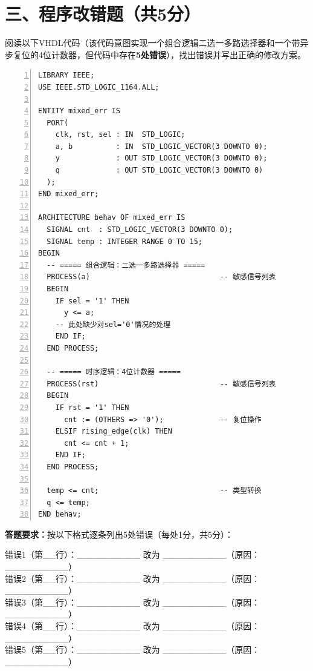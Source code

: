 \newpage

\section*{三、程序改错题（共5分）}

阅读以下VHDL代码（该代码意图实现一个组合逻辑二选一多路选择器和一个带异步复位的4位计数器，但代码中存在\textbf{5处错误}），找出错误并写出正确的修改方案。

\begin{lstlisting}[caption={存在5处错误的VHDL代码}, language=VDL, numbers=left]
LIBRARY IEEE;
USE IEEE.STD_LOGIC_1164.ALL;

ENTITY mixed_err IS
  PORT(
    clk, rst, sel : IN  STD_LOGIC;
    a, b          : IN  STD_LOGIC_VECTOR(3 DOWNTO 0);
    y             : OUT STD_LOGIC_VECTOR(3 DOWNTO 0);
    q             : OUT STD_LOGIC_VECTOR(3 DOWNTO 0)
  );
END mixed_err;

ARCHITECTURE behav OF mixed_err IS
  SIGNAL cnt  : STD_LOGIC_VECTOR(3 DOWNTO 0);
  SIGNAL temp : INTEGER RANGE 0 TO 15;
BEGIN
  -- ===== 组合逻辑：二选一多路选择器 =====
  PROCESS(a)                              -- 敏感信号列表
  BEGIN
    IF sel = '1' THEN
      y <= a;
    -- 此处缺少对sel='0'情况的处理
    END IF;
  END PROCESS;

  -- ===== 时序逻辑：4位计数器 =====
  PROCESS(rst)                            -- 敏感信号列表
  BEGIN
    IF rst = '1' THEN
      cnt := (OTHERS => '0');             -- 复位操作
    ELSIF rising_edge(clk) THEN
      cnt <= cnt + 1;
    END IF;
  END PROCESS;

  temp <= cnt;                            -- 类型转换
  q <= temp;
END behav;
\end{lstlisting}

\vspace{0.3cm}

\begin{framed}
\textbf{答题要求：}按以下格式逐条列出5处错误（每处1分，共5分）：

\noindent 错误1（第\_\_行）：\_\_\_\_\_\_\_\_\_\_ 改为 \_\_\_\_\_\_\_\_\_\_（原因：\_\_\_\_\_\_\_\_\_\_）\\
错误2（第\_\_行）：\_\_\_\_\_\_\_\_\_\_ 改为 \_\_\_\_\_\_\_\_\_\_（原因：\_\_\_\_\_\_\_\_\_\_）\\
错误3（第\_\_行）：\_\_\_\_\_\_\_\_\_\_ 改为 \_\_\_\_\_\_\_\_\_\_（原因：\_\_\_\_\_\_\_\_\_\_）\\
错误4（第\_\_行）：\_\_\_\_\_\_\_\_\_\_ 改为 \_\_\_\_\_\_\_\_\_\_（原因：\_\_\_\_\_\_\_\_\_\_）\\
错误5（第\_\_行）：\_\_\_\_\_\_\_\_\_\_ 改为 \_\_\_\_\_\_\_\_\_\_（原因：\_\_\_\_\_\_\_\_\_\_）
\end{framed}

